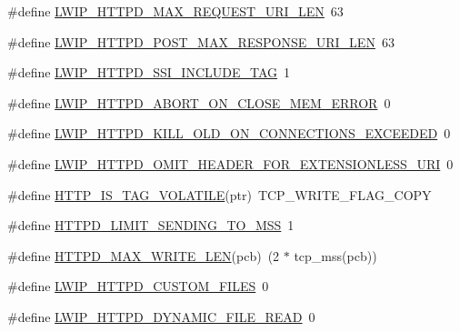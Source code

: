 \begin{DoxyCompactItemize}
\item 
\#define \hyperlink{group__httpd__opts_gaca4ef53e7a9abbd8d4bd8bc1ba7b486a}{L\+W\+I\+P\+\_\+\+H\+T\+T\+P\+D\+\_\+\+M\+A\+X\+\_\+\+R\+E\+Q\+U\+E\+S\+T\+\_\+\+U\+R\+I\+\_\+\+L\+EN}~63
\item 
\#define \hyperlink{group__httpd__opts_gaa27f7c5450392d10aeed033ca878cce3}{L\+W\+I\+P\+\_\+\+H\+T\+T\+P\+D\+\_\+\+P\+O\+S\+T\+\_\+\+M\+A\+X\+\_\+\+R\+E\+S\+P\+O\+N\+S\+E\+\_\+\+U\+R\+I\+\_\+\+L\+EN}~63
\item 
\#define \hyperlink{group__httpd__opts_ga975961a6d22d1a077118fb85dfec809a}{L\+W\+I\+P\+\_\+\+H\+T\+T\+P\+D\+\_\+\+S\+S\+I\+\_\+\+I\+N\+C\+L\+U\+D\+E\+\_\+\+T\+AG}~1
\item 
\#define \hyperlink{group__httpd__opts_ga0ff20ebc4ab50d4aa6151c3241dacb3a}{L\+W\+I\+P\+\_\+\+H\+T\+T\+P\+D\+\_\+\+A\+B\+O\+R\+T\+\_\+\+O\+N\+\_\+\+C\+L\+O\+S\+E\+\_\+\+M\+E\+M\+\_\+\+E\+R\+R\+OR}~0
\item 
\#define \hyperlink{group__httpd__opts_ga0d5074965efd40786182287895feb691}{L\+W\+I\+P\+\_\+\+H\+T\+T\+P\+D\+\_\+\+K\+I\+L\+L\+\_\+\+O\+L\+D\+\_\+\+O\+N\+\_\+\+C\+O\+N\+N\+E\+C\+T\+I\+O\+N\+S\+\_\+\+E\+X\+C\+E\+E\+D\+ED}~0
\item 
\#define \hyperlink{group__httpd__opts_ga82a030ce2ecdcf741b02b7be41c012b3}{L\+W\+I\+P\+\_\+\+H\+T\+T\+P\+D\+\_\+\+O\+M\+I\+T\+\_\+\+H\+E\+A\+D\+E\+R\+\_\+\+F\+O\+R\+\_\+\+E\+X\+T\+E\+N\+S\+I\+O\+N\+L\+E\+S\+S\+\_\+\+U\+RI}~0
\item 
\#define \hyperlink{group__httpd__opts_ga662e88120b507426374dd8ebbd54a048}{H\+T\+T\+P\+\_\+\+I\+S\+\_\+\+T\+A\+G\+\_\+\+V\+O\+L\+A\+T\+I\+LE}(ptr)~T\+C\+P\+\_\+\+W\+R\+I\+T\+E\+\_\+\+F\+L\+A\+G\+\_\+\+C\+O\+PY
\item 
\#define \hyperlink{group__httpd__opts_ga5410b604b135deaf5efc472dd7ab9d88}{H\+T\+T\+P\+D\+\_\+\+L\+I\+M\+I\+T\+\_\+\+S\+E\+N\+D\+I\+N\+G\+\_\+\+T\+O\+\_\+M\+SS}~1
\item 
\#define \hyperlink{group__httpd__opts_ga9faa2c18e1963ab5dfae826f6ee6d874}{H\+T\+T\+P\+D\+\_\+\+M\+A\+X\+\_\+\+W\+R\+I\+T\+E\+\_\+\+L\+EN}(pcb)~(2 $\ast$ tcp\+\_\+mss(pcb))
\item 
\#define \hyperlink{group__httpd__opts_gadadb70f5663cdf004bf879e3b5d326bd}{L\+W\+I\+P\+\_\+\+H\+T\+T\+P\+D\+\_\+\+C\+U\+S\+T\+O\+M\+\_\+\+F\+I\+L\+ES}~0
\item 
\#define \hyperlink{group__httpd__opts_ga1ee8d7c975c7e3d1c9d9dd9b43660c79}{L\+W\+I\+P\+\_\+\+H\+T\+T\+P\+D\+\_\+\+D\+Y\+N\+A\+M\+I\+C\+\_\+\+F\+I\+L\+E\+\_\+\+R\+E\+AD}~0
\item 

\end{DoxyCompactItemize}
